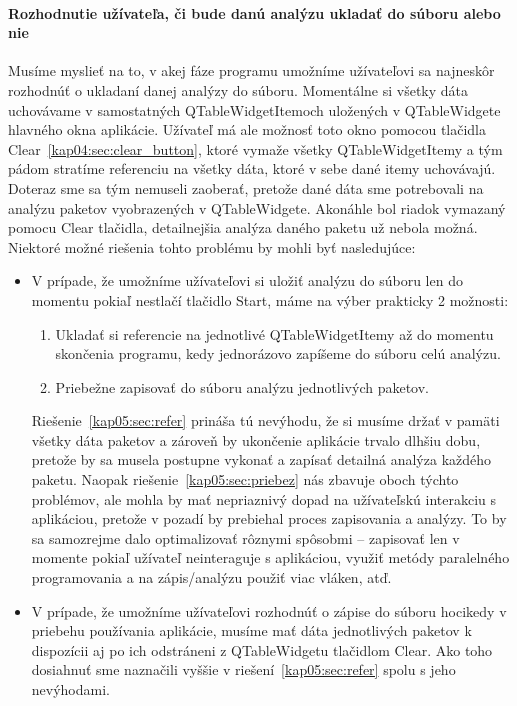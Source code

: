 \paragraph{Rozhodnutie užívateľa, či bude danú analýzu ukladať do súboru alebo nie}
\hfill \break
Musíme myslieť na to, v akej fáze programu umožníme užívateľovi sa najneskôr rozhodnúť o ukladaní danej analýzy do súboru. Momentálne si všetky dáta uchovávame v samostatných QTableWidgetItemoch uložených v QTableWidgete hlavného okna aplikácie. Užívateľ má ale možnosť toto okno  pomocou tlačidla Clear~\ref{kap04:sec:clear_button}, ktoré vymaže všetky QTableWidgetItemy a tým pádom stratíme referenciu na všetky dáta, ktoré v sebe dané itemy uchovávajú. Doteraz sme sa tým nemuseli zaoberať, pretože dané dáta sme potrebovali na analýzu paketov vyobrazených v QTableWidgete. Akonáhle bol riadok vymazaný pomocu Clear tlačidla, detailnejšia analýza daného paketu už nebola možná. Niektoré možné riešenia tohto problému by mohli byť nasledujúce:
\begin{itemize}
\item V prípade, že umožníme užívateľovi si uložiť analýzu do súboru len do momentu pokiaľ nestlačí tlačidlo Start, máme na výber prakticky 2 možnosti:
\begin{enumerate}
\item \label{kap05:sec:refer} Ukladať si referencie na jednotlivé QTableWidgetItemy až do momentu skončenia programu, kedy jednorázovo zapíšeme do súboru celú analýzu.
\item \label{kap05:sec:priebez} Priebežne zapisovať do súboru analýzu jednotlivých paketov.
\end{enumerate}
Riešenie~\ref{kap05:sec:refer} prináša tú nevýhodu, že si musíme držať v pamäti všetky dáta paketov a zároveň by ukončenie aplikácie trvalo dlhšiu dobu, pretože by sa musela postupne vykonať a zapísať detailná analýza každého paketu. Naopak riešenie~\ref{kap05:sec:priebez} nás zbavuje oboch týchto problémov, ale mohla by mať nepriaznivý dopad na užívateľskú interakciu s aplikáciou, pretože v pozadí by prebiehal proces zapisovania a analýzy. To by sa samozrejme dalo optimalizovať rôznymi spôsobmi -- zapisovať len v momente pokiaľ užívateľ neinteraguje s aplikáciou, využiť metódy paralelného programovania a na zápis/analýzu použiť viac vláken, atď.

\item V prípade, že umožníme užívateľovi rozhodnúť o zápise do súboru hocikedy v priebehu používania aplikácie, musíme mať dáta jednotlivých paketov k dispozícii aj po ich odstráneni z QTableWidgetu tlačidlom Clear. Ako toho dosiahnuť sme naznačili vyššie v riešení~\ref{kap05:sec:refer} spolu s jeho nevýhodami.
\end{itemize}

